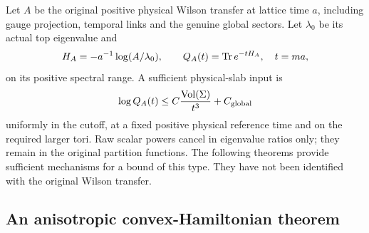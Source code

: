 \documentclass[11pt,letterpaper]{article}
\numberwithin{equation}{section}
\theoremstyle{definition}\newtheorem{definition}[theorem]{Definition}
\theoremstyle{remark}\newtheorem{remark}[theorem]{Remark}
\begin{document}
Let $A$ be the original positive physical Wilson transfer at lattice time $a$, including gauge projection, temporal links and the genuine global sectors. Let $\lambda_0$ be its actual top eigenvalue and
\[
 H_A=-a^{-1}\log(A/\lambda_0),\qquad
 Q_A(t)=\operatorname{Tr} e^{-tH_A},\quad t=ma,
\]
on its positive spectral range. A sufficient physical-slab input is
\begin{equation}
 \log Q_A(t)\le C\frac{\operatorname{Vol}(\Sigma)}{t^3}+C_{\rm global}
 \label{eq:S94target}
\end{equation}
uniformly in the cutoff, at a fixed positive physical reference time and on the required larger tori. Raw scalar powers cancel in eigenvalue ratios only; they remain in the original partition functions. The following theorems provide sufficient mechanisms for a bound of this type. They have not been identified with the original Wilson transfer.

\subsection{An anisotropic convex-Hamiltonian theorem}
\end{document}
